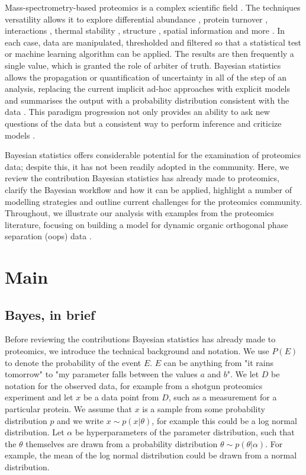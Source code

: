 \documentclass[12pt,english, journal=jpr, layout=twocolumn]{article}
\begin{document}
Mass-spectrometry-based proteomics is a complex scientific field \citep{Bantscheff::2007}. The techniques versatility allows it to explore differential abundance \citep{Bantscheff::2007}, protein turnover \citep{Mathieson::2018}, interactions \citep{Huttlin::2015}, thermal stability \citep{Mateus::2020}, structure \citep{Schopper::2017,Masson::2019}, spatial information \citep{Gessel::2014, Geladaki::2019, Barylyuk::2020} and more \citep{Toby::2016, Nightingale::2018, Johnson::2019}. In each case, data are manipulated, thresholded and filtered so that a statistical test or machine learning algorithm can be applied. The results are then frequently a single value, which is granted the role of arbiter of truth. Bayesian statistics allows the propagation or quantification of uncertainty in all of the step of an analysis, replacing the current implicit ad-hoc approaches with explicit models and summarises the output with a probability distribution consistent with the data \citep{Gelman::2020}. This paradigm progression not only provides an ability to ask new questions of the data but a consistent way to perform inference and criticize models \citep{Gelman::1995, Gelman::2020}. 

Bayesian statistics offers considerable potential for the examination of proteomics data; despite this, it has not been readily adopted in the community. Here, we review the contribution Bayesian statistics has already made to proteomics, clarify the Bayesian workflow and how it can be applied, highlight a number of modelling strategies and outline current challenges for the proteomics community. Throughout, we illustrate our analysis with examples from the proteomics literature, focusing on building a model for dynamic organic orthogonal phase separation (oops) data \citep{Queiroz::2019}.
\section{Main}
\subsection{Bayes, in brief}
Before reviewing the contributions Bayesian statistics has already made to proteomics, we introduce the technical background and notation. We use $P(E)$ to denote the probability of the event $E$. $E$ can be anything from "it rains tomorrow" to "my parameter falls between the values $a$ and $b$". We let $D$ be notation for the observed data, for example from a shotgun proteomics experiment and let $x$ be a data point from $D$, such as a measurement for a particular protein. We assume that $x$ is a sample from some probability distribution $p$ and we write $x \sim p(x|\theta)$, for example this could be a log normal distribution. Let $\alpha$ be hyperparameters of the parameter distribution, such that the $\theta$ themselves are drawn from a probability distribution $\theta \sim p(\theta|\alpha)$. For example, the mean of the log normal distribution could be drawn from a normal distribution. 
\end{document}
